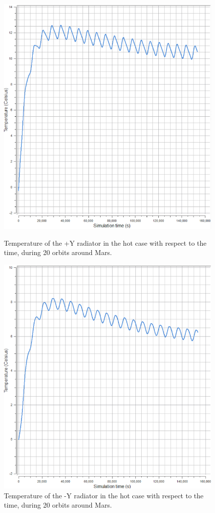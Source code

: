 \documentclass[a4paper, oneside, 11pt]{article}
\begin{document}
\begin{figure}[!ht] 
\begin{minipage}{8cm}
\centering
\includegraphics[scale=0.38]{PYhot}
\centering
\caption{Temperature of the +Y radiator in the hot case with respect to the time, during 20 orbits around Mars.}
\label{tempPYHOT}
\end{minipage} 
\medskip
\begin{minipage}{8cm}
\centering
\includegraphics[scale=0.39]{NYhot}
\caption{Temperature of the -Y radiator in the hot case with respect to the time, during 20 orbits around Mars.}
\label{tempMYhot}
\end{minipage} 
\end{figure}
\end{document}
